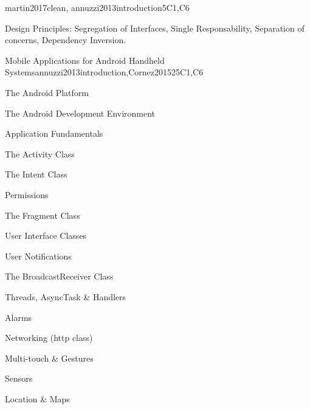 \begin{syllabus}
\begin{unit}{\PBDMobilePlatforms}{}{martin2017clean, annuzzi2013introduction}{5}{C1,C6}
\begin{topics}%
    \item \PBDMobilePlatformsTopicMobile
    \item Design Principles: Segregation of Interfaces, Single Responsability, Separation of concerns, Dependency Inversion.
    \item \PBDMobilePlatformsTopicChallenges
    \item \PBDMobilePlatformsTopicLocation
    \item \PBDMobilePlatformsTopicPerformance
    \item \PBDMobilePlatformsTopicMobilePlatform
    \item \PBDMobilePlatformsTopicEmerging
\end{topics}
\begin{learningoutcomes}
    \item \PBDMobilePlatformsLODesignAndMobile [\Familiarity]
    \item \PBDMobilePlatformsLODiscussTheMobile [\Familiarity]
    \item \PBDMobilePlatformsLODiscussThePower [\Familiarity]
    \item \PBDMobilePlatformsLOCompareAndProgrammingPurpose [\Familiarity]
\end{learningoutcomes}
\end{unit}

\begin{unit}{Mobile Applications for Android Handheld Systems}{}{annuzzi2013introduction,Cornez2015}{25}{C1,C6}
\begin{topics}
    \item The Android Platform
    \item The Android Development Environment
    \item Application Fundamentals
    \item The Activity Class
    \item The Intent Class
    \item Permissions
    \item The Fragment Class
    \item User Interface Classes
    \item User Notifications
    \item The BroadcastReceiver Class
    \item Threads, AsyncTask \& Handlers
    \item Alarms
    \item Networking (http class)
    \item Multi-touch \& Gestures
    \item Sensors
    \item Location \& Maps
\end{topics}


\end{unit}
\end{syllabus}
